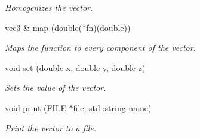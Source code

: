 \begin{DoxyCompactItemize}
\begin{DoxyCompactList}\small\item\em \-Homogenizes the vector. \end{DoxyCompactList}\item 
\hypertarget{classutil_1_1math_1_1vec3_a00f991fca6808eeebb252ce167f78a8c}{\hyperlink{classutil_1_1math_1_1vec3}{vec3} \& \hyperlink{classutil_1_1math_1_1vec3_a00f991fca6808eeebb252ce167f78a8c}{map} (double($\ast$fn)(double))}\label{classutil_1_1math_1_1vec3_a00f991fca6808eeebb252ce167f78a8c}

\begin{DoxyCompactList}\small\item\em \-Maps the function to every component of the vector. \end{DoxyCompactList}\item 
\hypertarget{classutil_1_1math_1_1vec3_ac564460ee54987dc39cf577285701816}{void \hyperlink{classutil_1_1math_1_1vec3_ac564460ee54987dc39cf577285701816}{set} (double x, double y, double z)}\label{classutil_1_1math_1_1vec3_ac564460ee54987dc39cf577285701816}

\begin{DoxyCompactList}\small\item\em \-Sets the value of the vector. \end{DoxyCompactList}\item 
\hypertarget{classutil_1_1math_1_1vec3_afd20d73037ce507437fe2f08ba0a3d07}{void \hyperlink{classutil_1_1math_1_1vec3_afd20d73037ce507437fe2f08ba0a3d07}{print} (\-F\-I\-L\-E $\ast$file, std\-::string name)}\label{classutil_1_1math_1_1vec3_afd20d73037ce507437fe2f08ba0a3d07}

\begin{DoxyCompactList}\small\item\em \-Print the vector to a file. \end{DoxyCompactList}\end{DoxyCompactItemize}
{\bf }\par
